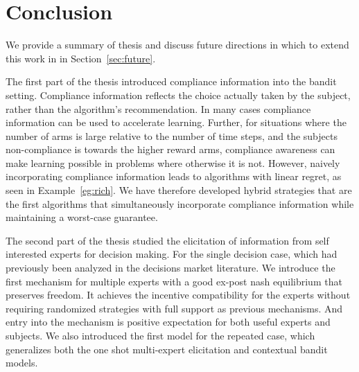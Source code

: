 \chapter{Conclusion}
\label{cha:conc}

We provide a summary of thesis and discuss future directions in which to extend this work in in Section~\ref{sec:future}.


The first part of the thesis introduced compliance information into the bandit setting. 
Compliance information reflects the choice actually taken by the subject, rather than the algorithm's recommendation. 
In many cases compliance information can be used to accelerate learning.
Further, for situations where the number of arms is large relative to the number of time steps, and the subjects non-compliance is towards the higher reward arms, compliance awareness can make learning possible in problems where otherwise it is not. 
However, naively incorporating compliance information leads to algorithms with linear regret, as seen in Example~\ref{eg:rich}. 
We have therefore developed hybrid strategies that are the first algorithms that simultaneously incorporate compliance information while maintaining a worst-case guarantee. 

The second part of the thesis studied the elicitation of information from self interested experts for decision making.
For the single decision case, which had previously been analyzed in the decisions market literature. We introduce the first mechanism for multiple experts with a good ex-post nash equilibrium that preserves freedom.
It achieves the incentive compatibility for the experts without requiring randomized strategies with full support as previous mechanisms. And entry into the mechanism is positive expectation for both useful experts and subjects.
We also introduced the first model for the repeated case, which generalizes both the one shot multi-expert elicitation and contextual bandit models.




